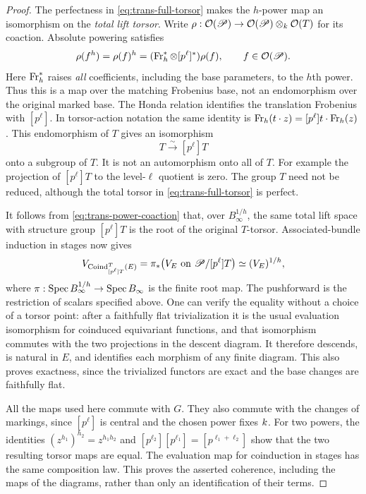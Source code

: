 \begin{proof}
The perfectness in \cref{eq:trans-full-torsor} makes the $h$-power map
an isomorphism on the \emph{total lift torsor}.  Write
$\rho:\mathcal O(\mathscr P)\to\mathcal O(\mathscr P)\otimes_k\mathcal O(T)$ for its
coaction.  Absolute powering satisfies
\begin{equation}
 \rho(f^h)=\rho(f)^h
     =(\operatorname{Fr}_h^*\otimes[p^\ell]^*)\rho(f),
 \qquad f\in\mathcal O(\mathscr P).
 \label{eq:trans-power-coaction}
\end{equation}
Here $\operatorname{Fr}_h^*$ raises \emph{all} coefficients, including the base
parameters, to the $h$th power.  Thus this is a map over the matching
Frobenius base, not an endomorphism over the original marked base.
The Honda relation identifies the translation Frobenius with
$[p^\ell]$.  In torsor-action notation the same identity is
$\operatorname{Fr}_h(t\cdot z)=[p^\ell]t\cdot\operatorname{Fr}_h(z)$.
This endomorphism of $T$ gives an isomorphism
\[
 T\xrightarrow{\sim}[p^\ell]T
\]
onto a subgroup of $T$.  It is not an automorphism onto all of $T$.
For example the projection of $[p^\ell]T$ to the level-$\ell$ quotient
is zero.  The group $T$ need not be reduced, although the total torsor
in \cref{eq:trans-full-torsor} is perfect.

It follows from \cref{eq:trans-power-coaction} that, over
$B_\infty^{1/h}$, the same total lift space with structure group
$[p^\ell]T$ is the root of the original $T$-torsor.  Associated-bundle
induction in stages now gives
\[
 V_{\operatorname{Coind}_{[p^\ell]T}^{T}(E)}
   =\pi_*\bigl(V_E\text{ on }\mathscr P/[p^\ell]T\bigr)
   \simeq (V_E)^{1/h},
\]
where $\pi:\operatorname{Spec} B_\infty^{1/h}\to\operatorname{Spec} B_\infty$ is the finite root
map.  The pushforward is the restriction of scalars specified above.
One can verify the equality without a choice of a torsor point:
after a faithfully flat trivialization it is the usual evaluation
isomorphism for coinduced equivariant functions, and that isomorphism
commutes with the two projections in the descent diagram.  It therefore
descends, is natural in $E$, and identifies each morphism of any finite
diagram.  This also proves exactness, since the trivialized functors
are exact and the base changes are faithfully flat.

All the maps used here commute with $G$.  They also commute with the
changes of markings, since $[p^\ell]$ is central and the chosen power
fixes $k$.  For two powers, the identities
$(z^{h_1})^{h_2}=z^{h_1h_2}$ and
$[p^{\ell_2}][p^{\ell_1}]=[p^{\ell_1+\ell_2}]$ show that the two
resulting torsor maps are equal.  The evaluation map for coinduction
in stages has the same composition law.  This proves the asserted
coherence, including the maps of the diagrams, rather than only an
identification of their terms.


\end{proof}
